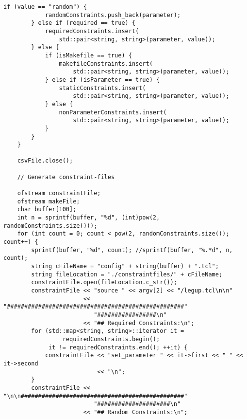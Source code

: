\begin{lstlisting}[caption={Constraint-generation program source code},label=lst:constraintGenerating]
        if (value == "random") {
            randomConstraints.push_back(parameter);
        } else if (required == true) {
            requiredConstraints.insert(
                std::pair<string, string>(parameter, value));
        } else {
            if (isMakefile == true) {
                makefileConstraints.insert(
                    std::pair<string, string>(parameter, value));
            } else if (isParameter == true) {
                staticConstraints.insert(
                    std::pair<string, string>(parameter, value));
            } else {
                nonParameterConstraints.insert(
                    std::pair<string, string>(parameter, value));
            }
        }
    }

    csvFile.close();

    // Generate constraint-files

    ofstream constraintFile;
    ofstream makeFile;
    char buffer[100];
    int n = sprintf(buffer, "%d", (int)pow(2, randomConstraints.size()));
    for (int count = 0; count < pow(2, randomConstraints.size()); count++) {
        sprintf(buffer, "%d", count); //sprintf(buffer, "%.*d", n, count);
        string cFileName = "config" + string(buffer) + ".tcl";
        string fileLocation = "./constraintfiles/" + cFileName;
        constraintFile.open(fileLocation.c_str());
        constraintFile << "source " << argv[2] << "/legup.tcl\n\n"
                       << "###################################################"
                          "#################\n"
                       << "## Required Constraints:\n";
        for (std::map<string, string>::iterator it =
                 requiredConstraints.begin();
             it != requiredConstraints.end(); ++it) {
            constraintFile << "set_parameter " << it->first << " " << it->second
                           << "\n";
        }
        constraintFile << "\n\n###############################################"
                          "#####################\n"
                       << "## Random Constraints:\n";


\end{lstlisting}
